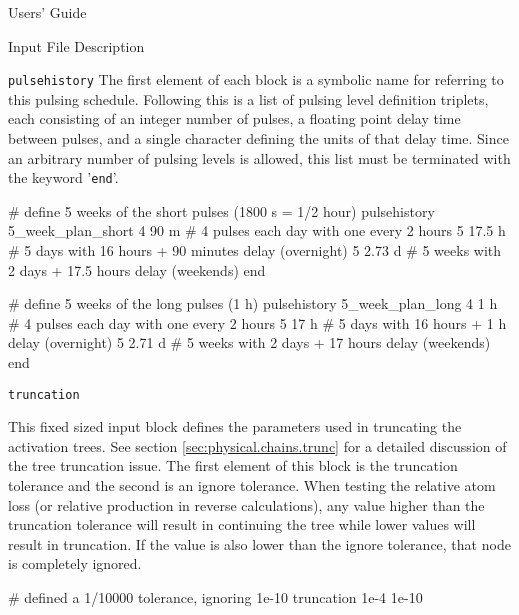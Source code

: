 \begin{chapter}{Users' Guide\label{app:user.guide}}
\begin{section}{Input File Description\label{app:user.input}}
\begin{subsection}{\texttt{pulsehistory}\label{app:user.input.pulse}}
      The first element of each block is a symbolic name for referring
      to this pulsing schedule.  Following this is a list of pulsing
      level definition triplets, each consisting of an integer number
      of pulses, a floating point delay time between pulses, and a
      single character defining the units of that delay time.  Since
      an arbitrary number of pulsing levels is allowed, this list must
      be terminated with the keyword '\texttt{end}'.

      \begin{center}
        \renewcommand{\baselinestretch}{1}\normalsize
        \begin{boxedverbatim}
# define 5 weeks of the short pulses (1800 s = 1/2 hour)
pulsehistory 5_week_plan_short
   4  90 m   # 4 pulses each day with one every 2 hours
   5  17.5 h # 5 days with 16 hours + 90 minutes delay (overnight)
   5  2.73 d # 5 weeks with 2 days + 17.5 hours delay (weekends)
end

# define 5 weeks of the long pulses (1 h)
pulsehistory 5_week_plan_long
   4  1 h    # 4 pulses each day with one every 2 hours
   5  17 h   # 5 days with 16 hours + 1 h delay (overnight)
   5  2.71 d # 5 weeks with 2 days + 17 hours delay (weekends)
end
\end{boxedverbatim}
      \end{center}

    \end{subsection}

    \begin{subsection}{\texttt{truncation}\label{app:user.input.trunc}}
      
      This fixed sized input block defines the parameters used in
      truncating the activation trees.  See section
      \ref{sec:physical.chains.trunc} for a detailed discussion of the
      tree truncation issue.  The first element of this block is the
      truncation tolerance and the second is an ignore tolerance.
      When testing the relative atom loss (or relative production in
      reverse calculations), any value higher than the truncation
      tolerance will result in continuing the tree while lower values
      will result in truncation.  If the value is also lower than the
      ignore tolerance, that node is completely ignored.

      \begin{center}
        \renewcommand{\baselinestretch}{1}\normalsize
        \begin{boxedverbatim}
# defined a 1/10000 tolerance, ignoring 1e-10
truncation   1e-4    1e-10
\end{boxedverbatim}
      \end{center}
      

\end{subsection}
\end{section}
\end{chapter}
